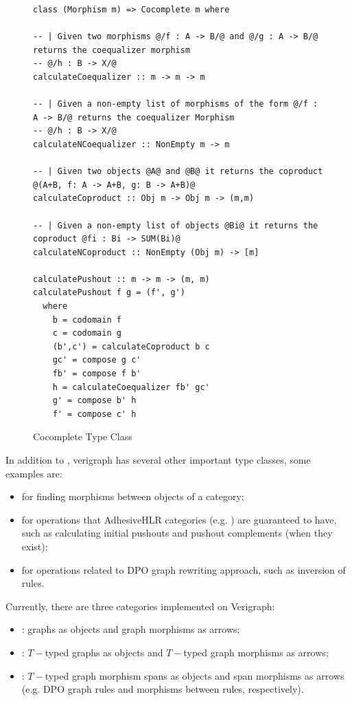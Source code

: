 \begin{figure}[!ht]
  \begin{verbatim}
class (Morphism m) => Cocomplete m where

-- | Given two morphisms @/f : A -> B/@ and @/g : A -> B/@ returns the coequalizer morphism
-- @/h : B -> X/@
calculateCoequalizer :: m -> m -> m

-- | Given a non-empty list of morphisms of the form @/f : A -> B/@ returns the coequalizer Morphism
-- @/h : B -> X/@
calculateNCoequalizer :: NonEmpty m -> m

-- | Given two objects @A@ and @B@ it returns the coproduct @(A+B, f: A -> A+B, g: B -> A+B)@
calculateCoproduct :: Obj m -> Obj m -> (m,m)

-- | Given a non-empty list of objects @Bi@ it returns the coproduct @fi : Bi -> SUM(Bi)@
calculateNCoproduct :: NonEmpty (Obj m) -> [m]

calculatePushout :: m -> m -> (m, m)
calculatePushout f g = (f', g')
  where
    b = codomain f
    c = codomain g
    (b',c') = calculateCoproduct b c
    gc' = compose g c'
    fb' = compose f b'
    h = calculateCoequalizer fb' gc'
    g' = compose b' h
    f' = compose c' h
\end{verbatim}
\caption{Cocomplete Type Class}\label{fig:verigraph:cocomplete-type-class}
\end{figure}

In addition to , verigraph has several other important type classes, some examples are:
\begin{itemize}
  \item {} for finding morphisms between objects of a category;
  \item {} for operations that AdhesiveHLR categories (e.g. ) are guaranteed to have, such as calculating initial pushouts and pushout complements (when they exist);
  \item {} for operations related to DPO graph rewriting approach, such as inversion of rules.
\end{itemize}

Currently, there are three categories implemented on Verigraph: 

\begin{itemize}
  \item {}: graphs as objects and graph morphisms as arrows; 
  \item {}: $T-$typed graphs as objects and $T-$typed graph morphisms as arrows; 
  \item {}: $T-$typed graph morphism spans as objects and span morphisms as arrows (e.g. DPO graph rules and morphisms between rules, respectively).
\end{itemize}

